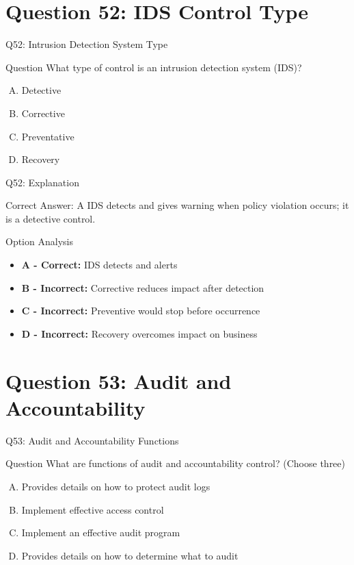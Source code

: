 \documentclass{beamer}
\begin{document}
	\section{Question 52: IDS Control Type}
	
	\begin{frame}{Q52: Intrusion Detection System Type}
		\begin{block}{Question}
			What type of control is an intrusion detection system (IDS)?
		\end{block}
		\begin{enumerate}[(A)]
			\item Detective
			\item Corrective
			\item Preventative
			\item Recovery
		\end{enumerate}
	\end{frame}
	
	\begin{frame}{Q52: Explanation}
		\begin{block}{Correct Answer: A}
			IDS detects and gives warning when policy violation occurs; it is a detective control.
		\end{block}
		\begin{block}{Option Analysis}
			\begin{itemize}
				\item \textbf{A - Correct:} IDS detects and alerts
				\item \textbf{B - Incorrect:} Corrective reduces impact after detection
				\item \textbf{C - Incorrect:} Preventive would stop before occurrence
				\item \textbf{D - Incorrect:} Recovery overcomes impact on business
			\end{itemize}
		\end{block}
	\end{frame}
	
	\section{Question 53: Audit and Accountability}
	
	\begin{frame}{Q53: Audit and Accountability Functions}
		\begin{block}{Question}
			What are functions of audit and accountability control? (Choose three)
		\end{block}
		\begin{enumerate}[(A)]
			\item Provides details on how to protect audit logs
			\item Implement effective access control
			\item Implement an effective audit program
			\item Provides details on how to determine what to audit
		\end{enumerate}
	\end{frame}
	
\end{document}
